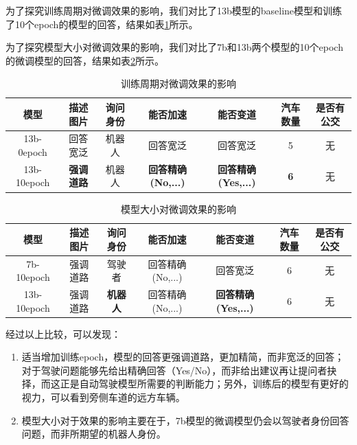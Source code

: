 \documentclass[
    linespread = 1.25
]{ctexart}
\begin{document}
为了探究训练周期对微调效果的影响，我们对比了13b模型的baseline模型和训练了10个epoch的模型的回答，结果如表\ref{effect_epoch}所示。

为了探究模型大小对微调效果的影响，我们对比了7b和13b两个模型的10个epoch的微调模型的回答，结果如表\ref{effect_size}所示。


\begin{table}[hbt]
\small
\centering
\caption{训练周期对微调效果的影响}%
\begin{tabular}{ccccccc}
\toprule
模型 & 描述图片 & 询问身份 & 能否加速 & 能否变道 & 汽车数量 & 是否有公交 \\
\midrule
13b-0epoch & 回答宽泛 & 机器人 & 回答宽泛 & 回答宽泛 & 5 & 无 \\
13b-10epoch & \textbf{强调道路} & 机器人 & \textbf{回答精确(No,...)} & \textbf{回答精确(Yes,...)} & \textbf{6} & 无 \\
\bottomrule
\end{tabular}
\label{effect_epoch}
\end{table}


\begin{table}[ht]
\centering
\caption{模型大小对微调效果的影响}%
\small
\begin{tabular}{ccccccc}
\toprule
模型 & 描述图片 & 询问身份 & 能否加速 & 能否变道 & 汽车数量 & 是否有公交 \\
\midrule
7b-10epoch & 强调道路 & 驾驶者 & 回答精确(No,...) & 回答宽泛 & 6 & 无 \\
13b-10epoch & 强调道路 & \textbf{机器人} & 回答精确(No,...) & \textbf{回答精确(Yes,...)} & 6 & 无 \\
\bottomrule
\end{tabular}
\label{effect_size}
\end{table}


经过以上比较，可以发现：

\begin{enumerate} 
    \item 适当增加训练epoch，模型的回答更强调道路，更加精简，而非宽泛的回答；对于驾驶问题能够先给出精确回答（Yes/No），而非给出建议再让提问者抉择，而这正是自动驾驶模型所需要的判断能力；另外，训练后的模型有更好的视力，可以看到旁侧车道的远方车辆。
    \item 模型大小对于效果的影响主要在于，7b模型的微调模型仍会以驾驶者身份回答问题，而非所期望的机器人身份。
\end{enumerate}
\end{document}

